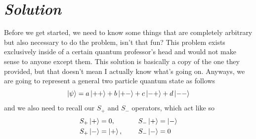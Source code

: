 \documentclass{article}
\begin{document}
\section*{\textit{Solution}} 
	Before we get started, we need to know some things that are completely arbitrary but also necessary to do the problem, isn't that fun? This problem exists exclusively inside of a certain quantum professor's head and would not make sense to anyone except them. This solution is basically a copy of the one they provided, but that doesn't mean I actually know what's going on. Anyways, we are going to represent a general two particle quantum state as follows
	\[ \ket{\psi} = a\ket{++} + b\ket{+-} + c\ket{-+} + d\ket{--} \]
	and we also need to recall our $S_+$ and $S_-$ operators, which act like so
	\begin{alignat}{2}
	&S_+ \ket{+} = 0,  &&S_- \ket{+} = \ket{-} \\
	&S_+ \ket{-} = \ket{+},\hspace{5mm}  &&S_- \ket{-} = 0 
	\end{alignat}
\end{document}
